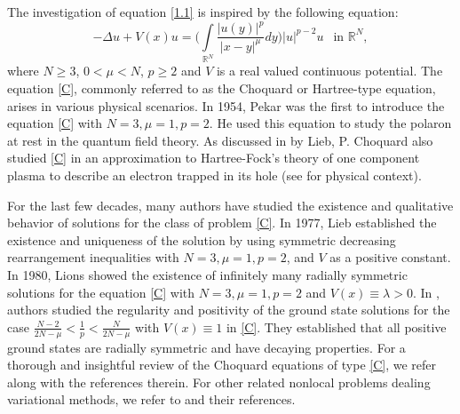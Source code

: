 \documentclass[11pt]{amsart}
\numberwithin{equation}{section}
\newcommand{\R}{\mathbb{R}}
\newcommand{\1}{\frac{1}{2}}
\begin{document}
	The investigation of equation \eqref{1.1} is inspired by the following equation:
	\begin{equation}
		\label{C}
		-\Delta u + V(x)u = \Bigg(\int\limits_{\R^N} \frac{|u(y)|^p}{|x-y|^\mu}dy\Bigg) |u|^{p-2}u  \ \ \text{ in } \R^N,
	\end{equation}	
	where $N \geq 3$, $0< \mu< N$, $p\geq 2$ and $V$ is a real valued continuous potential. The equation \eqref{C}, commonly referred to as the Choquard or Hartree-type equation, arises in various physical scenarios. In 1954, Pekar \cite{Pekar} was the first to introduce the equation \eqref{C} with $N=3, \mu=1, p=2$. He used this equation to study the polaron at rest in the quantum field theory. As discussed in \cite{Lieb} by Lieb, P. Choquard also studied \eqref{C} in an approximation to Hartree-Fock's theory of one component plasma to describe an electron trapped in its hole (see \cite{Lieb2} for physical context).
	
	For the last few decades, many authors have studied the existence and qualitative behavior of solutions for the class of problem \eqref{C}.  In 1977, Lieb \cite{Lieb} established the existence and uniqueness of the solution  by using symmetric decreasing rearrangement inequalities with $N=3, \mu=1, p=2$, and $V$ as a positive constant. In 1980, Lions \cite{Lions} showed the existence of infinitely many radially symmetric solutions for the equation \eqref{C} with $N=3, \mu=1, p=2$ and $V(x)\equiv\lambda>0$. In \cite{Moroz}, authors studied the regularity and positivity of the ground state solutions for the case $\frac{N-2}{2N-\mu}< \frac{1}{p}<\frac{N}{2N-\mu}$ with $V(x)\equiv 1$ in \eqref{C}. They established that all positive ground states are radially symmetric and have decaying properties. For a thorough and insightful review of the Choquard equations of type \eqref{C}, we refer \cite{Ackermann, Alves, Alves3, Biswas1, S.Li, Moroz1, Moroz2, Moroz3, Radulescu} along with the references therein. For other related nonlocal problems dealing  variational methods, we refer to \cite{Ding, Dou, He, Liu, ZShen} and their references.
	
\end{document}
